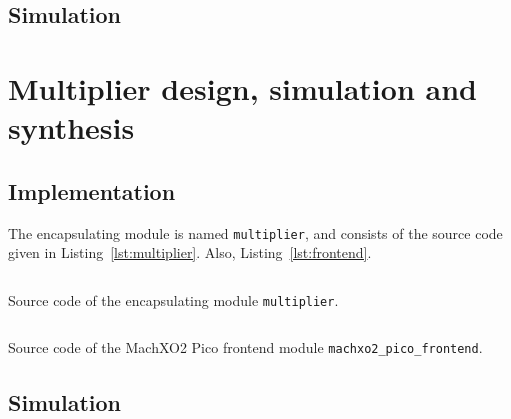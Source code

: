 \documentclass[a4paper]{article}
\begin{document}
\subsection{Simulation}
\label{sec:seq:sim}


\section{Multiplier design, simulation and synthesis}
\label{sec:mult}


\subsection{Implementation}
\label{sec:mult:impl}

The encapsulating module is named \texttt{multiplier}, and consists of the source code given in Listing~\ref{lst:multiplier}. Also, Listing~\ref{lst:frontend}.

\begin{listing}[ht]
  \inputminted{systemverilog}{../src/multiplier/multiplier.sv}
  \centering\caption{Source code of the encapsulating module \texttt{multiplier}.}
  \label{lst:multiplier}
\end{listing}

\begin{listing}[ht]
  \inputminted{systemverilog}{../src/frontends/machxo2_pico_frontend.sv}
  \centering\caption{Source code of the MachXO2 Pico frontend module \texttt{machxo2\_pico\_frontend}.}
  \label{lst:frontend}
\end{listing}

\subsection{Simulation}
\label{sec:mult:sim}

\end{document}
